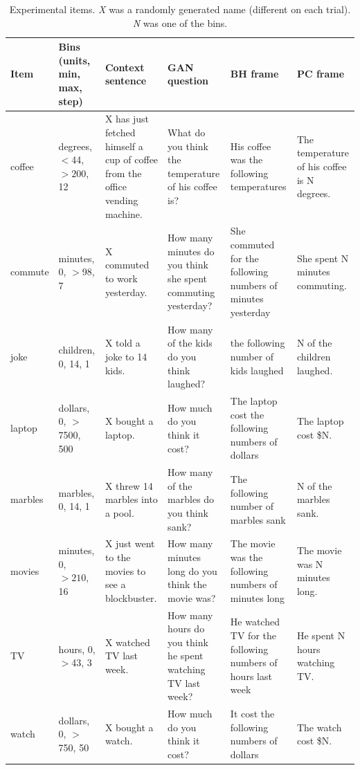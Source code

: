 \documentclass[10pt,letterpaper]{article}
\begin{document}
\begin{table}
  \footnotesize
  \centering
  \begin{tabular}{l p{2.2cm} p{2.5cm} p{3.5cm} p{3cm} p{2.5cm}}
	\toprule
	\textbf{Item} & \textbf{Bins (units, min, max, step)} & \textbf{Context sentence} & \textbf{GAN question} & \textbf{BH frame} & \textbf{PC frame} \\
	\midrule
    coffee & degrees, $<$44, $>200$, 12& X has just fetched himself a cup of coffee from the office vending machine. & What do you think the temperature of his coffee is?  & His coffee was the following temperatures & The temperature of his coffee is N degrees.\\
    	\midrule
	commute & minutes, 0, $>$98, 7 & X commuted to work yesterday. & How many minutes do you think she spent commuting yesterday? & She commuted for the following numbers of minutes yesterday & She spent N minutes commuting.\\
		\midrule
	joke & children, 0, 14, 1  & X told a joke to 14 kids. & How many of the kids do you think laughed? & the following number of kids laughed & N of the children laughed.\\
    	\midrule
	laptop & dollars, 0, $>$7500, 500& X bought a laptop. & How much do you think it cost? & The laptop cost the following numbers of dollars & The laptop cost \$N.\\
	\midrule
    marbles & marbles, 0, 14, 1 & X threw 14 marbles into a pool. & How many of the marbles do you think sank? & The following number of marbles sank & N of the marbles sank.\\
	\midrule
	movies & minutes, 0, $>210$, 16& X just went to the movies to see a blockbuster. & How many minutes long do you think the movie was? & The movie was the following numbers of minutes long & The movie was N minutes long.\\
	\midrule
	TV & hours, 0, $>$43, 3& X watched TV last week. & How many hours do you think he spent watching TV last week? & He watched TV for the following numbers of hours last week & He spent N hours watching TV.\\
	\midrule
	watch & dollars, 0, $>$750, 50 & X bought a watch.& How much do you think it cost? & It cost the following numbers of dollars & The watch cost \$N.\\
    \bottomrule
  \end{tabular}
  \caption{Experimental items. \emph{X} was a randomly generated name (different on each trial). \emph{N} was one of the bins.}
  \label{tab:Items}
\end{table}
\end{document}
